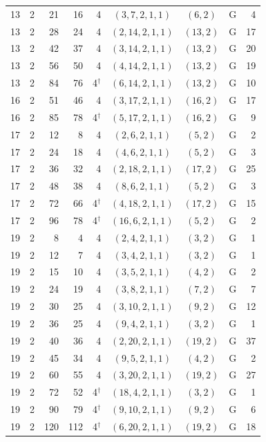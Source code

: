 \begin{tabular}{@{}rrrrrcccr@{}}
\midrule
13 & 2 & 21 & 16 & 4 & $(3,7,2,1,1)$ & $(6,2)$ & G & 4 \\
13 & 2 & 28 & 24 & 4 & $(2,14,2,1,1)$ & $(13,2)$ & G & 17 \\
13 & 2 & 42 & 37 & 4 & $(3,14,2,1,1)$ & $(13,2)$ & G & 20 \\
13 & 2 & 56 & 50 & 4 & $(4,14,2,1,1)$ & $(13,2)$ & G & 19 \\
13 & 2 & 84 & 76 & 4$^{\dagger}$ & $(6,14,2,1,1)$ & $(13,2)$ & G & 10 \\
\midrule
16 & 2 & 51 & 46 & 4 & $(3,17,2,1,1)$ & $(16,2)$ & G & 17 \\
16 & 2 & 85 & 78 & 4$^{\dagger}$ & $(5,17,2,1,1)$ & $(16,2)$ & G & 9 \\
\midrule
17 & 2 & 12 & 8 & 4 & $(2,6,2,1,1)$ & $(5,2)$ & G & 2 \\
17 & 2 & 24 & 18 & 4 & $(4,6,2,1,1)$ & $(5,2)$ & G & 3 \\
17 & 2 & 36 & 32 & 4 & $(2,18,2,1,1)$ & $(17,2)$ & G & 25 \\
17 & 2 & 48 & 38 & 4 & $(8,6,2,1,1)$ & $(5,2)$ & G & 3 \\
17 & 2 & 72 & 66 & 4$^{\dagger}$ & $(4,18,2,1,1)$ & $(17,2)$ & G & 15 \\
17 & 2 & 96 & 78 & 4$^{\dagger}$ & $(16,6,2,1,1)$ & $(5,2)$ & G & 2 \\
\midrule
19 & 2 & 8 & 4 & 4 & $(2,4,2,1,1)$ & $(3,2)$ & G & 1 \\
19 & 2 & 12 & 7 & 4 & $(3,4,2,1,1)$ & $(3,2)$ & G & 1 \\
19 & 2 & 15 & 10 & 4 & $(3,5,2,1,1)$ & $(4,2)$ & G & 2 \\
19 & 2 & 24 & 19 & 4 & $(3,8,2,1,1)$ & $(7,2)$ & G & 7 \\
19 & 2 & 30 & 25 & 4 & $(3,10,2,1,1)$ & $(9,2)$ & G & 12 \\
19 & 2 & 36 & 25 & 4 & $(9,4,2,1,1)$ & $(3,2)$ & G & 1 \\
19 & 2 & 40 & 36 & 4 & $(2,20,2,1,1)$ & $(19,2)$ & G & 37 \\
19 & 2 & 45 & 34 & 4 & $(9,5,2,1,1)$ & $(4,2)$ & G & 2 \\
19 & 2 & 60 & 55 & 4 & $(3,20,2,1,1)$ & $(19,2)$ & G & 27 \\
19 & 2 & 72 & 52 & 4$^{\dagger}$ & $(18,4,2,1,1)$ & $(3,2)$ & G & 1 \\
19 & 2 & 90 & 79 & 4$^{\dagger}$ & $(9,10,2,1,1)$ & $(9,2)$ & G & 6 \\
19 & 2 & 120 & 112 & 4$^{\dagger}$ & $(6,20,2,1,1)$ & $(19,2)$ & G & 18 \\
\bottomrule
\end{tabular}
